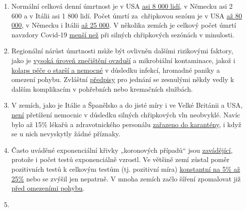 \begin{enumerate}
{  9, ale 109 let}.
\item
  Normální celková denní úmrtnost je v USA
  \href{https://www.cdc.gov/mmwr/volumes/68/wr/mm6826a5.htm}{asi 8 000
  lidí}, v Německu asi 2 600 a v Itálii asi 1 800 lidí. Počet úmrtí
  za~chřipkovou sezónu je v USA
  \href{https://www.statnews.com/2018/09/26/cdc-us-flu-deaths-winter/}{až
  80 000}, v Německu i Itálii
  \href{https://www.sciencedirect.com/science/article/pii/S1201971219303285}{až
  25 000}. V několika zemích je celkový počet úmrtí navzdory Covid-19
  \href{https://www.euromomo.eu/graphs-and-maps/}{menší než} při silných
  chřipkových sezónách v minulosti.
\item
  Regionální nárůst úmrtnosti může být ovlivněn dalšími rizikovými
  faktory, jako je
  \href{https://www.theguardian.com/environment/2020/apr/20/air-pollution-may-be-key-contributor-to-covid-19-deaths-study?utm_medium}{vysoká
  úroveň znečištění ovzduší} a mikrobiální kontaminace, jakož i
  \href{https://swprs.org/covid-19-a-report-from-italy/}{kolaps péče o
  starší a nemocné} v důsledku infekcí, hromadné paniky a omezení
  pohybu. Zvláštní
  \href{https://www.ecdc.europa.eu/sites/default/files/documents/COVID-19-safe-handling-of-bodies-or-persons-dying-from-COVID19.pdf}{předpisy}
  pro jednání se zesnulými někdy vedly k dalším komplikacím v pohřebních
  nebo kremačních službách.
\item
  V zemích, jako je Itálie a Španělsko a do jisté míry i ve Velké
  Británii a USA,
  \href{https://off-guardian.org/2020/04/02/coronavirus-fact-check-1-flu-doesnt-overwhelm-our-hospitals/}{není}
  přetížení nemocnic v důsledku silných chřipkových vln neobvyklé. Navíc
  bylo až 15\% lékařů a zdravotnického personálu
  \href{https://www.reuters.com/article/us-health-coronavirus-spain-morgue-idUSKBN21B1PP}{zařazeno
  do karantény}, i když se u nich nevyskytly žádné příznaky.
\item
  Často uváděné exponenciální křivky „koronových případů`` jsou
  \href{https://fivethirtyeight.com/features/coronavirus-case-counts-are-meaningless/}{zavádějící},
  protože i počet testů exponenciálně vzrostl. Ve většině zemí zůstal
  poměr pozitivních testů k celkovým testům (tj. pozitivní míra)
  \href{https://swprs.org/rate-of-positive-covid19-tests/}{konstantní na
  5\% až 25\%} nebo se zvýšil jen nepatrně. V mnoha zemích začlo šíření
  zpomalovat již
  \href{https://www.dailymail.co.uk/news/article-8235979/UKs-coronavirus-crisis-peaked-lockdown-Expert-argues-draconian-measures-unnecessary.html}{před
  omezeními pohybu}.
\item

\end{enumerate}
